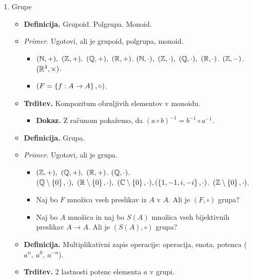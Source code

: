 \begin{enumerate}
    \newpage
    \item Grupe
    \begin{itemize}
        \item \colorbox{purple!30}{\textbf{Definicija.}} Grupoid. Polgrupa. Monoid.
        \item \colorbox{yellow!30}{\emph{Primer.}}  Ugotovi, ali je grupoid, polgrupa, monoid.
        \begin{itemize}
            \item $(\NN, +), \ (\ZZ, +), \ (\QQ, +),  \ (\RR, +)$.
            $(\mathbb{N}, \cdot), \ (\mathbb{Z}, \cdot), \ (\mathbb{Q}, \cdot),  \ (\mathbb{R}, \cdot)$.
            $(\mathbb{Z}, -)$.
            $(\mathbb{R}^3, \times)$.
            \item $(F = \left\{f: A \to A\right\}, \circ)$.
        \end{itemize}
        \item \colorbox{blue!30}{\textbf{Trditev.}} Kompozitum obrnljivih elementov v monoidu.
        \begin{itemize}
            \item \colorbox{green!30}{\textbf{Dokaz.}} Z računom pokažemo, da $(a \circ b)^{-1} = b^{-1} \circ a^{-1}$.
        \end{itemize}
        \item \colorbox{purple!30}{\textbf{Definicija.}} Grupa.
        \item \colorbox{yellow!30}{\emph{Primer.}}  Ugotovi, ali je grupa.
        \begin{itemize}
            \item $(\mathbb{Z}, +), \ (\mathbb{Q}, +),  \ (\mathbb{R}, +)$.
            $(\mathbb{Q}, \cdot)$.
            $(\mathbb{Q} \setminus \left\{0\right\}, \cdot),  \ (\mathbb{R} \setminus \left\{0\right\}, \cdot), \ (\mathbb{C} \setminus \left\{0\right\}, \cdot), (\left\{1, -1, i, -i\right\}, \cdot)$.
            $(\mathbb{Z} \setminus \left\{0\right\}, \cdot)$.            
            \item Naj bo $F$ množica vseh preslikav iz $A$ v $A$. Ali je $(F, \circ)$ grupa?  
            \item Naj bo $A$ množica in naj bo $S(A)$ množica vseh bijektivnih preslikav $A \to A$. Ali je $(S(A), \circ)$ grupa?
        \end{itemize}
        \item \colorbox{purple!30}{\textbf{Definicija.}} Multiplikativni zapis operacije: operacija, enota, potenca ($a^n, \ a^0, \ a^{-n}$).
        \item \colorbox{blue!30}{\textbf{Trditev.}} 2 lastnosti potenc elementa $a$ v grupi.
        \begin{itemize}

\end{itemize}
\end{itemize}
\end{enumerate}
